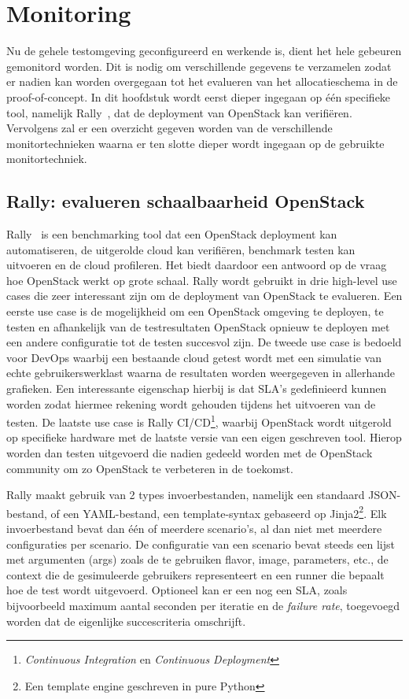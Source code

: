 \chapter{Monitoring}
\label{chap:monitoring}

Nu de gehele testomgeving geconfigureerd en werkende is, dient het hele gebeuren gemonitord worden. Dit is nodig om verschillende gegevens te verzamelen zodat er nadien kan worden overgegaan tot het evalueren van het allocatieschema in de proof-of-concept. In dit hoofdstuk wordt eerst dieper ingegaan op één specifieke tool, namelijk Rally~\cite{OpenStack2017b}, dat de deployment van OpenStack kan verifiëren. Vervolgens zal er een overzicht gegeven worden van de verschillende monitortechnieken waarna er ten slotte dieper wordt ingegaan op de gebruikte monitortechniek.

\section{Rally: evalueren schaalbaarheid OpenStack}
\label{sec:rally}

Rally~\cite{OpenStack2017b} is een benchmarking tool dat een OpenStack deployment kan automatiseren, de uitgerolde cloud kan verifiëren, benchmark testen kan uitvoeren en de cloud profileren. Het biedt daardoor een antwoord op de vraag hoe OpenStack werkt op grote schaal. Rally wordt gebruikt in drie high-level use cases die zeer interessant zijn om de deployment van OpenStack te evalueren. Een eerste use case is de mogelijkheid om een OpenStack omgeving te deployen, te testen en afhankelijk van de testresultaten OpenStack opnieuw te deployen met een andere configuratie tot de testen succesvol zijn. De tweede use case is bedoeld voor DevOps waarbij een bestaande cloud getest wordt met een simulatie van echte gebruikerswerklast waarna de resultaten worden weergegeven in allerhande grafieken. Een interessante eigenschap hierbij is dat SLA's gedefinieerd kunnen worden zodat hiermee rekening wordt gehouden tijdens het uitvoeren van de testen. De laatste use case is Rally CI/CD\footnote{\textit{Continuous Integration} en\textit{ Continuous Deployment}}, waarbij OpenStack wordt uitgerold op specifieke hardware met de laatste versie van een eigen geschreven tool. Hierop worden dan testen uitgevoerd die nadien gedeeld worden met de OpenStack community om zo OpenStack te verbeteren in de toekomst.

Rally maakt gebruik van 2 types invoerbestanden, namelijk een standaard JSON-bestand, of een YAML-bestand, een template-syntax gebaseerd op Jinja2\footnote{Een template engine geschreven in pure Python}. Elk invoerbestand bevat dan één of meerdere scenario's, al dan niet met meerdere configuraties per scenario. De configuratie van een scenario bevat steeds een lijst met argumenten (args) zoals de te gebruiken flavor, image, parameters, etc., de context die de gesimuleerde gebruikers representeert en een runner die bepaalt hoe de test wordt uitgevoerd. Optioneel kan er een nog een SLA, zoals bijvoorbeeld maximum aantal seconden per iteratie en de \textit{failure rate}, toegevoegd worden dat de eigenlijke succescriteria omschrijft.

